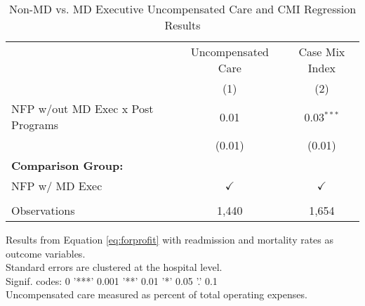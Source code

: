 \begin{table}[ht!]
   \caption{\label{tab:MD_noMD_uncompCMI_fullsample} Non-MD vs. MD Executive Uncompensated Care and CMI Regression Results}
   \bigskip
   \centering
   \begin{tabular}{lcc}
      \toprule
                                        & Uncompensated Care & Case Mix Index\\  
                                        & (1)                & (2)\\  
      \midrule 
      NFP w/out MD Exec x Post Programs & 0.01               & 0.03$^{***}$\\   
                                        & (0.01)             & (0.01)\\   
      \textbf{Comparison Group:}        &                    & \\  
      NFP w/ MD Exec                    & $\checkmark$       & $\checkmark$\\   
       \\
      Observations                      & 1,440              & 1,654\\  
      \bottomrule
   \end{tabular}
   
   \par \raggedright 
   Results from Equation \ref{eq:forprofit} with readmission and mortality rates as outcome variables.\\
   Standard errors are clustered at the hospital level.\\
   Signif. codes: 0 '***' 0.001 '**' 0.01 '*' 0.05 '.' 0.1\\
   Uncompensated care measured as percent of total operating expenses.
\end{table}
